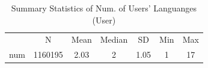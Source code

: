 \begin{table}[htbp]\centering
\def\sym#1{\ifmmode^{#1}\else\(^{#1}\)\fi}
\caption{Summary Statistics of Num. of Users' Languanges  (User)}
\begin{tabular}{l*{1}{cccccc}}
\toprule
                    &           N&        Mean&      Median&          SD&         Min&         Max\\
\label{tab:userlangnum}
num                 &     1160195&        2.03&           2&        1.05&           1&          17\\
\bottomrule
\end{tabular}
\end{table}
